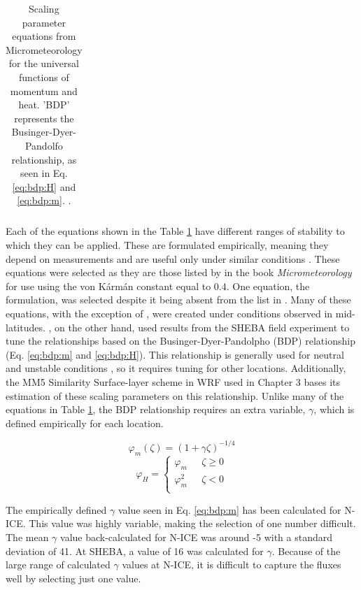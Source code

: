 {\begin{table}[p]
\begin{tabular}{| c | c |}
        \hline
    \end{tabular}
    \caption[Scaling parameter equations.]{Scaling parameter equations from Micrometeorology \citep{foken:2008} for the universal functions of momentum and heat. 'BDP' represents the Businger-Dyer-Pandolfo relationship, as seen in Eq. \ref{eq:bdp:H} and \ref{eq:bdp:m}. \citep{foken:2008}.}
    \label{tab:stability}
\end{table}}

Each of the equations shown in the Table \ref{tab:stability} have different ranges of stability to which they can be applied. These are formulated empirically, meaning they depend on measurements and are useful only under similar conditions \citep{stull:1988, foken:2008}. These equations were selected as they are those listed by \citet{foken:2008} in the book \textit{Micrometeorology} for use using the von K\'{a}rm\'{a}n constant equal to 0.4. One equation, the \citet{andreas:2010} formulation, was selected despite it being absent from the list in \citet{foken:2008}. Many of these equations, with the exception of \citet{andreas:2010}, were created under conditions observed in mid-latitudes. \citet{andreas:2010}, on the other hand, used results from the SHEBA field experiment to tune the relationships based on the Businger-Dyer-Pandolpho (BDP) relationship (Eq. \ref{eq:bdp:m} and \ref{eq:bdp:H}). This relationship is generally used for neutral and unstable conditions \citep{foken:2008}, so it requires tuning for other locations. Additionally, the MM5 Similarity Surface-layer scheme in WRF \citep{paulson:1970} used in Chapter 3 bases its estimation of these scaling parameters on this relationship. Unlike many of the equations in Table \ref{tab:stability}, the BDP relationship requires an extra variable, $\gamma$, which is defined empirically for each location.

\begin{equation}\label{eq:bdp:m}
\varphi_{m}(\zeta) = (1 + \gamma \zeta)^{-1/4}
\end{equation}
\begin{equation}\label{eq:bdp:H}
\varphi_{H} = \begin{cases} 
\varphi_{m} & \text{    } \zeta \geq 0 \\ 
\varphi_{m}^{2} & \text{    } \zeta < 0 \\ 
\end{cases}
\end{equation}

The empirically defined $\gamma$ value seen in Eq. \ref{eq:bdp:m} \citep{paulson:1970, chen:2001} has been calculated for N-ICE. This value was highly variable, making the selection of one number difficult. The mean $\gamma$ value back-calculated for N-ICE was around -5 with a standard deviation of 41. At SHEBA, a value of 16 was calculated for $\gamma$. Because of the large range of calculated $\gamma$ values at N-ICE, it is difficult to capture the fluxes well by selecting just one value. 

